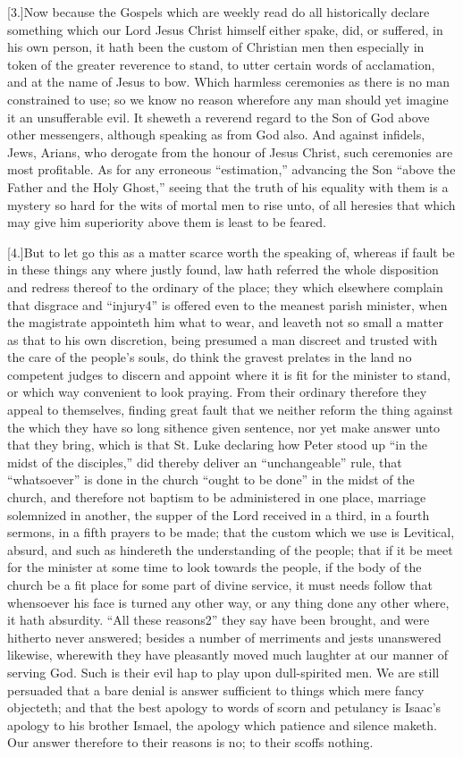 [3.]Now because the Gospels which are weekly read do all historically declare something which our Lord Jesus Christ himself either spake, did, or suffered, in his own person, it hath been the custom of Christian men then especially in token of the greater reverence to stand, to utter certain words of acclamation, and at the name of Jesus to bow. Which harmless ceremonies as there is no  man constrained to use; so we know no reason wherefore any man should yet imagine it an unsufferable evil.
 It sheweth a reverend regard to the Son of God above other messengers, although speaking as from God also. And against infidels, Jews, Arians, who derogate from the honour of Jesus Christ, such ceremonies are most profitable. As for any erroneous “estimation,” advancing the Son “above the Father and the Holy Ghost,” seeing that the truth of his equality with them is a mystery so hard for the wits of mortal men to rise unto, of all heresies that which may give him superiority above them is least to be feared.

[4.]But to let go this as a matter scarce worth the speaking of, whereas if fault be in these things any where justly found, law hath referred the whole disposition and redress thereof to the ordinary of the place; they which elsewhere complain that disgrace and “injury4” is offered even to the meanest parish minister, when the magistrate appointeth him what to wear, and leaveth not so small a matter as that to his own discretion, being presumed a man discreet and trusted with the care of the people’s souls, do think the gravest prelates in the land no competent judges to discern and appoint where it is fit for the minister to stand, or which way convenient to look praying. From their ordinary therefore they appeal  to themselves, finding great fault that we neither reform the thing against the which they have so long sithence given sentence, nor yet make answer unto that they bring, which is that St. Luke declaring how Peter stood up “in the midst of the disciples,” did thereby deliver an “unchangeable” rule, that “whatsoever” is done in the church “ought to be  done” in the midst of the church,
 and therefore not baptism to be administered in one place, marriage solemnized in another, the supper of the Lord received in a third, in a fourth sermons, in a fifth prayers to be made; that the custom which we use is Levitical, absurd, and such as hindereth the understanding of the people; that if it be meet for the minister at some time to look towards the people, if the body of the church be a fit place for some part of divine service, it must needs follow that whensoever his face is turned any other way, or any thing done any other where, it hath absurdity. “All these reasons2” they say have been brought, and were hitherto never answered; besides a number of merriments and jests unanswered likewise, wherewith they have pleasantly moved much laughter at our manner of serving God. Such is their evil hap to play upon dull-spirited men. We are still persuaded that a bare denial is answer sufficient to things which mere fancy objecteth; and that the best apology to words of scorn and petulancy is Isaac’s apology to his brother Ismael, the apology which patience and silence maketh. Our answer therefore to their reasons is no; to their scoffs nothing.


